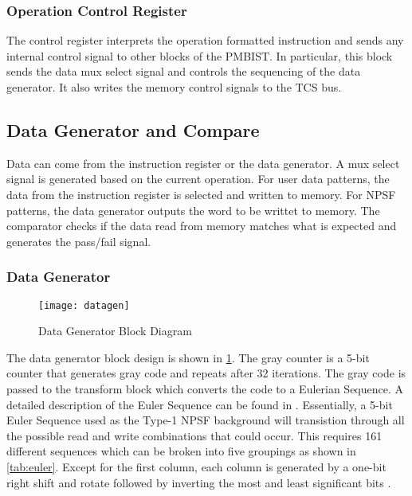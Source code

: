 \subsubsection{Operation Control Register}
The control register interprets the operation formatted instruction and sends any internal control signal to other blocks of the PMBIST.  In particular, this block sends the data mux select signal and controls the sequencing of the data generator.  It also writes the memory control signals to the TCS bus.  

\subsection{Data Generator and Compare}
Data can come from the instruction register or the data generator.  A mux select signal is generated based on the current operation.  For user data patterns, the data from the instruction register is selected and written to memory.  For NPSF patterns, the data generator outputs the word to be writtet to memory.  The comparator checks if the data read from memory matches what is expected and generates the pass/fail signal.

\subsubsection{Data Generator}
\begin{figure}[h!]
  \centering
  \texttt{[image: datagen]}
  \caption{Data Generator Block Diagram}
  \label{fig:datagen}
\end{figure}
The data generator block design is shown in \ref{fig:datagen}.  The gray counter is a 5-bit counter that generates gray code and repeats after 32 iterations.  The gray code is passed to the transform block which converts the code to a Eulerian Sequence.  A detailed description of the Euler Sequence can be found in \cite{1675556}.  Essentially, a 5-bit Euler Sequence used as the Type-1 NPSF background will transistion through all the possible read and write combinations that could occur.  This requires 161 different sequences which can be broken into five groupings as shown in \ref{tab:euler}.  Except for the first column, each column is generated by a one-bit right shift and rotate followed by inverting the most and least significant bits \cite{00957583}.

